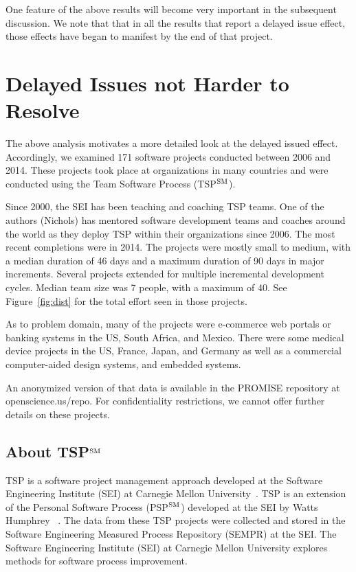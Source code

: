 \documentclass[smallcondesed]{svjour3}
\newcommand{\fig}[1]{Figure~\ref{fig:#1}}
\begin{document}
 One feature of the above results will become very important in the subsequent discussion. We note that that in all
the results that report a delayed issue effect, those effects have began to manifest by the end of that project.

 

\section{Delayed Issues not  Harder  to Resolve}

The above analysis motivates a more detailed look at the delayed issued effect.  
Accordingly, we examined 171 software projects conducted between 2006 and 2014. These projects took place at organizations in many countries and were conducted using  the Team Software Process (TSP$\textsuperscript{SM}$).

Since 2000, the SEI has been teaching and coaching TSP teams. One of the authors (Nichols) has mentored software development teams and coaches around the world as they deploy TSP within their organizations since 2006.  The  most recent completions were in 2014.
The projects were mostly small to medium, with a median duration of 46 days and a maximum duration of 90 days in major increments. 
Several projects extended for multiple incremental development cycles. 
Median team size was 7 people, with a maximum of 40. See \fig{dist} for the total
effort seen in those projects.

As to problem domain,
many of the projects were e-commerce web portals or banking systems in the US, South Africa, and Mexico. 
There were  some  medical device projects in  the US, France, Japan, and Germany as well  as a commercial computer-aided design systems, and embedded systems. 

An anonymized version of that data is available in the PROMISE repository at openscience.us/repo.
For confidentiality restrictions, we cannot offer 
further details on these projects.

\subsection{About TSP$\textsuperscript{SM}$}

TSP is a software project management approach developed at the Software Engineering Institute (SEI) at Carnegie Mellon University~\cite{tsp00}. TSP is an extension of the Personal Software Process (PSP$\textsuperscript{SM}$) developed at the SEI by Watts Humphrey ~\cite{tsp00}. The data from these TSP projects were collected and stored in the Software Engineering Measured Process Repository (SEMPR) at the SEI. The Software Engineering Institute (SEI) at Carnegie Mellon University explores methods for software process improvement.
 
\end{document}
